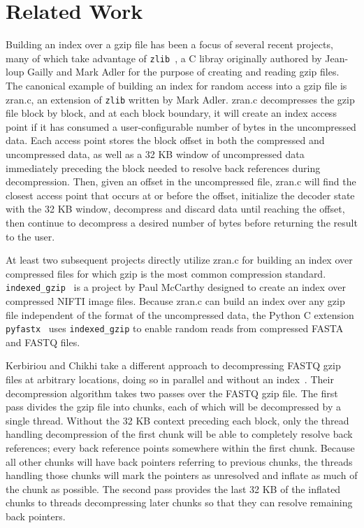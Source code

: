 \documentclass[unnumsec,webpdf,contemporary,large]{oup-authoring-template}
\newcommand{\gzip}{gzip\xspace}
\begin{document}
\section{Related Work}

Building an index over a \gzip file has been a focus of several recent projects,
many of which take advantage of \texttt{zlib}~\cite{zlib}, a C libray originally
authored by Jean-loup Gailly and Mark Adler for the purpose of creating and reading
\gzip files. The canonical example of building an index for random access into a \gzip 
file is zran.c, an extension of \texttt{zlib} written by Mark Adler. zran.c decompresses 
the \gzip file block by block, and at each block boundary, it will create an index access 
point if it has consumed a user-configurable number of bytes in the uncompressed data. 
Each access point stores the block offset in both the compressed and uncompressed data, 
as well as a 32 KB window of uncompressed data immediately preceding the block needed 
to resolve back references during decompression. Then, given an offset in the uncompressed 
file, zran.c will find the closest access point that occurs at or before the offset, 
initialize the decoder state with the 32 KB window, decompress and discard data until
reaching the offset, then continue to decompress a desired number of bytes before returning
the result to the user.

At least two subsequent projects directly utilize zran.c for building an index over 
compressed files for which \gzip is the most common compression standard.
\texttt{indexed\_gzip}~\cite{indexedgzip} is a project by Paul McCarthy designed
to create an index over compressed NIFTI image files. Because zran.c can build an
index over any \gzip file independent of the format of the uncompressed data, the
Python C extension \texttt{pyfastx}~\cite{pyfastx} uses \texttt{indexed\_gzip} to
enable random reads from compressed FASTA and FASTQ files.

Kerbiriou and Chikhi take a different approach to decompressing FASTQ \gzip files
at arbitrary locations, doing so in parallel and without an index~\cite{kerbiriou2019parallel}.
Their decompression algorithm takes two passes over the FASTQ \gzip file. The first
pass divides the \gzip file into chunks, each of which will be decompressed by a single
thread. Without the 32 KB context preceding each block, only the thread handling 
decompression of the first chunk will be able to completely resolve back references;
every back reference points somewhere within the first chunk. Because all other chunks
will have back pointers referring to previous chunks, the threads handling those chunks
will mark the pointers as unresolved and inflate as much of the chunk as possible. The 
second pass provides the last 32 KB of the inflated chunks to threads decompressing 
later chunks so that they can resolve remaining back pointers.
\end{document}
